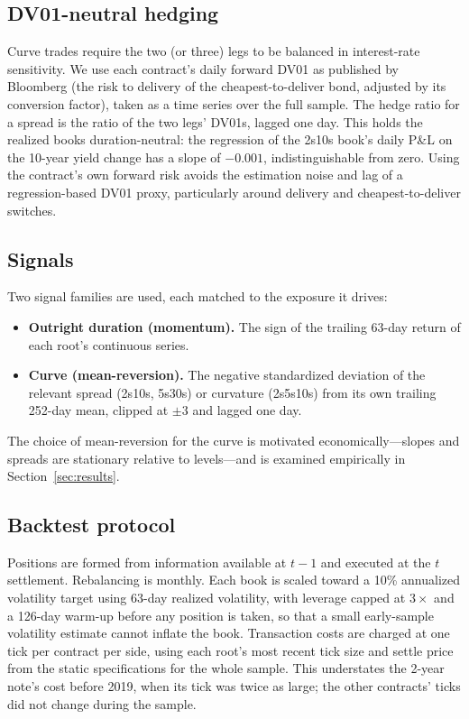 \documentclass[conference]{IEEEtran}
\begin{document}
\subsection{DV01-neutral hedging}
Curve trades require the two (or three) legs to be balanced in interest-rate
sensitivity. We use each contract's daily forward DV01 as published by Bloomberg
(the risk to delivery of the cheapest-to-deliver bond, adjusted by its conversion
factor), taken as a time series over the full sample. The hedge ratio for a spread
is the ratio of the two legs' DV01s, lagged one day. This holds the realized books
duration-neutral: the regression of the 2s10s book's daily P\&L on the 10-year
yield change has a slope of $-0.001$, indistinguishable from zero. Using the
contract's own forward risk avoids the estimation noise and lag of a
regression-based DV01 proxy, particularly around delivery and cheapest-to-deliver
switches.

\subsection{Signals}
Two signal families are used, each matched to the exposure it drives:
\begin{itemize}
\item \textbf{Outright duration (momentum).} The sign of the trailing 63-day
return of each root's continuous series.
\item \textbf{Curve (mean-reversion).} The negative standardized deviation of
the relevant spread (2s10s, 5s30s) or curvature (2s5s10s) from its own
trailing 252-day mean, clipped at $\pm 3$ and lagged one day.
\end{itemize}
The choice of mean-reversion for the curve is motivated economically---slopes
and spreads are stationary relative to levels---and is examined empirically in
Section~\ref{sec:results}.

\subsection{Backtest protocol}
Positions are formed from information available at $t{-}1$ and executed at the
$t$ settlement. Rebalancing is monthly. Each book is scaled toward a 10\%
annualized volatility target using 63-day realized volatility, with leverage
capped at $3\times$ and a 126-day warm-up before any position is taken, so that
a small early-sample volatility estimate cannot inflate the book. Transaction
costs are charged at one tick per contract per side, using each root's most
recent tick size and settle price from the static specifications for the whole
sample. This understates the 2-year note's cost before 2019, when its tick was
twice as large; the other contracts' ticks did not change during the sample.
\end{document}
